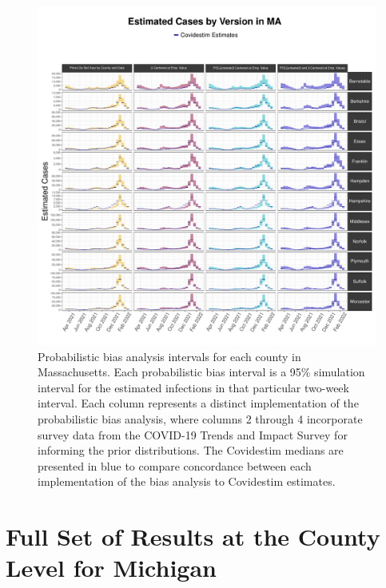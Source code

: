 \documentclass[12pt,twoside]{smiththesis}
\begin{document}
\begin{figure}

{\centering \includegraphics[width=1\linewidth]{figure/ma_pb_compared_to_covidestim} 

}

\caption{\label{fig:ma-comp-covidestim}Probabilistic bias analysis intervals for each county in Massachusetts. Each probabilistic bias interval is a 95\% simulation interval for the estimated infections in that particular two-week interval. Each column represents a distinct implementation of the probabilistic bias analysis, where columns 2 through 4 incorporate survey data from the COVID-19 Trends and Impact Survey for informing the prior distributions. The Covidestim medians are presented in blue to compare concordance between each implementation of the bias analysis to Covidestim estimates.}\label{fig:unnamed-chunk-113}
\end{figure}
\hypertarget{full-set-of-results-at-the-county-level-for-michigan}{%
\section{Full Set of Results at the County Level for Michigan}\label{full-set-of-results-at-the-county-level-for-michigan}}
\end{document}
